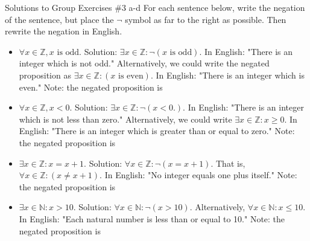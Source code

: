 \documentclass[10pt]{beamer}
\begin{document}
\begin{frame}{Solutions to Group Exercises \#3 a-d}
\small 
For each sentence below, write the negation of the sentence, but place the $\lnot$ symbol as far to the right as possible. Then rewrite the negation in English.  
    \begin{itemize}    
        \item[a.] $\forall x \in \mathbb{Z}, x \text{ is odd.} $  \alert{Solution: $\exists x \in \mathbb{Z}: \lnot (x \text{ is odd})$.  In English: "There is an integer which is not odd." Alternatively, we could write the negated proposition as $\exists x \in \mathbb{Z}: (x \text{ is even})$.  In English: "There is an integer which is even."  Note: the negated proposition is}\, 
        \item[b.] $\forall x \in \mathbb{Z}, x<0.$ \alert{Solution: $\exists x \in \mathbb{Z}: \lnot (x<0.)$.   In English: "There is an integer which is not less than zero."  Alternatively, we could write $\exists x \in \mathbb{Z}: x \geq 0$. In English: "There is an integer which is greater than or equal to zero."   Note: the negated proposition is}\, 
        \item[c.] $\exists x \in \mathbb{Z}: x=x+1.$ \alert{Solution: $\forall x \in \mathbb{Z}: \lnot (x=x+1)$. That is, $\forall x \in \mathbb{Z}: (x \neq x+1)$. In English: "No integer equals one plus itself." Note: the negated proposition is}\, 
        \item[d.] $\exists x \in \mathbb{N}: x>10.$ \alert{Solution: $\forall x \in \mathbb{N}: \lnot (x>10)$. Alternatively, $\forall x \in \mathbb{N}: x \leq 10.$ In English: "Each natural number is less than or equal to 10."  Note: the negated proposition is}\,  
        \end{itemize}
\end{frame}
\end{document}
